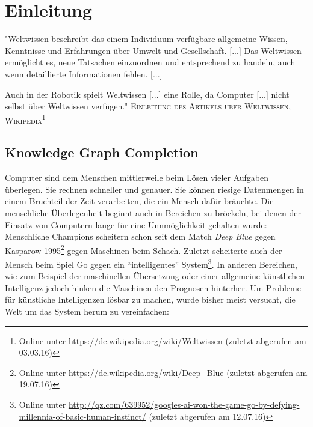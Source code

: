 
\chapter{Einleitung} %

\label{Chapter1} %


\newcommand{\keyword}[1]{\textbf{#1}}
\newcommand{\tabhead}[1]{\textbf{#1}}
\newcommand{\code}[1]{\texttt{#1}}
\newcommand{\file}[1]{\texttt{\bfseries#1}}
\newcommand{\option}[1]{\texttt{\itshape#1}}


\begin{itquote}
"Weltwissen beschreibt das einem Individuum verfügbare allgemeine Wissen, Kenntnisse und Erfahrungen über Umwelt und Gesellschaft. [...]
Das Weltwissen ermöglicht es, neue Tatsachen einzuordnen und entsprechend zu handeln, auch wenn detaillierte Informationen fehlen. [...]

Auch in der Robotik spielt Weltwissen [...] eine Rolle,
da Computer [...] nicht selbst über Weltwissen verfügen."
\flushright
\textsc{Einleitung des Artikels über Weltwissen, Wikipedia\footnote{Online unter \url{https://de.wikipedia.org/wiki/Weltwissen} (zuletzt abgerufen am 03.03.16)}}
\end{itquote}

\section{Knowledge Graph Completion}

Computer sind dem Menschen mittlerweile beim Lösen vieler Aufgaben überlegen. Sie rechnen schneller und genauer.
Sie können riesige Datenmengen in einem Bruchteil der Zeit verarbeiten, die ein Mensch dafür bräuchte. Die menschliche
Überlegenheit beginnt auch in Bereichen zu bröckeln, bei denen der Einsatz von Computern lange für eine Unnmöglichkeit
gehalten wurde: Menschliche Champions scheitern schon seit dem Match \emph{Deep Blue} gegen Kasparow 1995\footnote{
Online unter \url{https://de.wikipedia.org/wiki/Deep_Blue} (zuletzt abgerufen am 19.07.16)} gegen Maschinen beim Schach. Zuletzt
scheiterte auch der Mensch beim Spiel Go gegen ein ``intelligentes'' System\footnote{Online unter \url{http://qz.com/639952/googles-ai-won-the-game-go-by-defying-millennia-of-basic-human-instinct/} (zuletzt abgerufen am 12.07.16)}.
In anderen Bereichen, wie zum Beispiel der maschinellen Übersetzung oder einer allgemeine künstlichen Intelligenz jedoch hinken die Maschinen den Prognosen hinterher.
Um Probleme für künstliche Intelligenzen lösbar zu machen, wurde bisher meist versucht, die Welt um das System herum zu vereinfachen:\\

